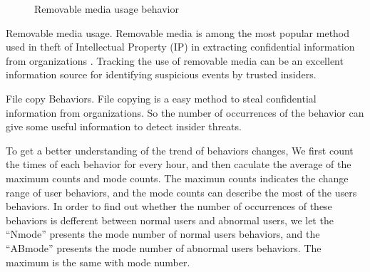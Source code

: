 \documentclass[conference]{IEEEtran}
\begin{document}
\begin{figure}[!t]
\centering
{} 
\caption{ Removable media usage behavior }
\label{fig4}
\end{figure}

\noindent Removable media usage.
Removable media is among the most popular method used in theft of Intellectual Property (IP) in extracting confidential information from organizations \cite{b18}. Tracking the use of removable media can be an excellent information source for identifying suspicious events by trusted insiders.

\noindent File copy Behaviors.
File copying is a easy method to steal confidential information from organizations. So the  number of occurrences of the behavior can give some useful information to detect insider threats. 

To get a better understanding of the trend of behaviors changes, We first count the times of each behavior for every hour, and then caculate the average of the  maximum counts and mode counts. The maximun counts indicates the change range of user behaviors, and the mode counts can describe the most of the users behaviors. In order to find out whether the number of occurrences of these behaviors is defferent between normal users and abnormal users, we let the ``Nmode'' presents the mode number of normal users behaviors, and the ``ABmode'' presents the mode number of abnormal users behaviors. The maximum is the same with mode number.
\end{document}
